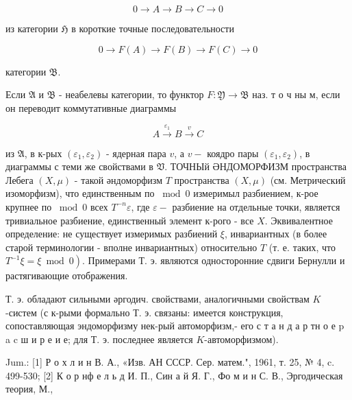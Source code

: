 \documentclass[10pt]{article}
\begin{document}
\[

0 \longrightarrow A \longrightarrow B \longrightarrow C \longrightarrow 0

\]



из категории $\mathfrak{H}$ в короткие точные последовательности



\[

0 \longrightarrow F(A) \longrightarrow F(B) \longrightarrow F(C) \longrightarrow 0

\]



категории $\mathfrak{B}$.



Если $\mathfrak{A}$ и $\mathfrak{B}$ - неабелевы категории, то функтор $F: \mathfrak{Y} \rightarrow \mathfrak{B}$ наз. т о ч ны $м$, если он переводит коммутативные диаграммы



\[

A \stackrel{\varepsilon_{1}}{\longrightarrow} B \stackrel{v}{\longrightarrow} C

\]



из $\mathfrak{A}$, в к-рых $\left(\varepsilon_{1}, \varepsilon_{2}\right)$ - ядерная пара $v$, а $v-$ коядро пары $\left(\varepsilon_{1}, \varepsilon_{2}\right)$, в диаграммы с теми же свойствами в $\mathfrak{V}$. ТОЧНЫй ӘНДОМОРФИЗМ пространства Лебега $(X, \mu)$ - такой әндоморфизм $T$ пространства $(X, \mu)$ (см. Метрический изоморфизм), что единственным по $\bmod 0$ измеримыл разбиением, к-рое крупнее по $\bmod 0$ всех $T^{-n} \varepsilon$, где $\varepsilon-$ разбиение на отдельные точки, является тривиальное разбиение, единственный элемент к-рого - все $X$. Эквивалентное определение: не существует измеримых разбиений $\xi$, инвариантных (в более старой терминологии - вполне инвариантных) относительно $T$ (т. е. таких, что $\left.T^{-1} \xi=\xi \bmod 0\right)$. Примерами Т. э. являются односторонние сдвиги Бернулли и растягивающие отображения.



Т. э. обладают сильными әргодич. свойствами, аналогичными свойствам $K$-систем (с к-рыми формально Т. э. связаны: имеется конструкция, сопоставляющая эндоморфизму нек-рый автоморфизм,- его с т а н д а р тн о е p a c ш и р е и е; для Т. э. последнее является $K$-автоморфизмом).



Jum.: [1] Р о х л и н В. А., «Изв. АН СССР. Сер. матем.", 1961, т. 25, № 4, c. 499-530; [2] К о р нф е л ь д И. П., Син а й Я. Г., Фо м и н С. В., Эргодическая теория, М.,
\end{document}
